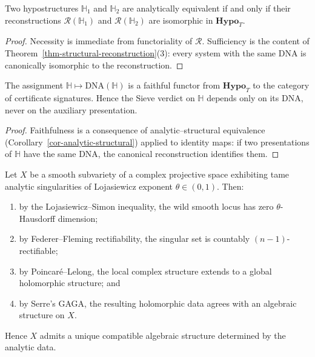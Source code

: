 \begin{corollary}\label{cor-analytic-structural}
Two hypostructures $\mathbb H_1$ and $\mathbb H_2$ are analytically equivalent if and only if their reconstructions $\mathcal R(\mathbb H_1)$ and $\mathcal R(\mathbb H_2)$ are isomorphic in $\mathbf{Hypo}_T$.
\end{corollary}

\begin{proof}
Necessity is immediate from functoriality of $\mathcal R$. Sufficiency is the content of Theorem~\ref{thm-structural-reconstruction}(3): every system with the same DNA is canonically isomorphic to the reconstruction.
\end{proof}

\begin{corollary}\label{cor-permit-flow}
The assignment $\mathbb H \mapsto \mathrm{DNA}(\mathbb H)$ is a faithful functor from $\mathbf{Hypo}_T$ to the category of certificate signatures. Hence the Sieve verdict on $\mathbb H$ depends only on its DNA, never on the auxiliary presentation.
\end{corollary}

\begin{proof}
Faithfulness is a consequence of analytic--structural equivalence (Corollary~\ref{cor-analytic-structural}) applied to identity maps: if two presentations of $\mathbb H$ have the same DNA, the canonical reconstruction identifies them.
\end{proof}

\begin{lemma}\label{lem-analytic-algebraic-rigidity}
Let $X$ be a smooth subvariety of a complex projective space exhibiting tame analytic singularities of Lojasiewicz exponent $\theta \in (0,1)$. Then:
\begin{enumerate}
\item by the Lojasiewicz--Simon inequality, the wild smooth locus has zero $\theta$-Hausdorff dimension;
\item by Federer--Fleming rectifiability, the singular set is countably $(n-1)$-rectifiable;
\item by Poincar\'e--Lelong, the local complex structure extends to a global holomorphic structure; and
\item by Serre's GAGA, the resulting holomorphic data agrees with an algebraic structure on $X$.
\end{enumerate}
Hence $X$ admits a unique compatible algebraic structure determined by the analytic data.
\end{lemma}

